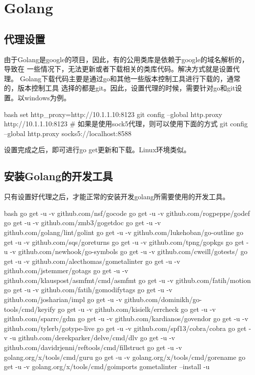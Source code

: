 \chapter{Golang}

\section{代理设置}
由于Golang是google的项目，因此，有的公用类库是依赖于google的域名解析的，导致在
一些情况下，无法更新或者下载相关的类库代码。解决方式就是设置代理。
Golang下载代码主要是通过go和其他一些版本控制工具进行下载的，通常的，版本控制工具
选择的都是git。因此，设置代理的时候，需要针对go和git设置。以windows为例。
\begin{code-block}{bash}
set http_proxy=http://10.1.1.10:8123
git config --global http.proxy http://10.1.1.10:8123
# 如果是使用sock5代理，则可以使用下面的方式
git config --global http.proxy socks5://localhost:8588
\end{code-block}

设置完成之后，即可进行go get更新和下载。Linux环境类似。

\section{安装Golang的开发工具}
只有设置好代理之后，才能正常的安装开发golang所需要使用的开发工具。
\begin{code-block}{bash}
go get -u -v github.com/nsf/gocode
go get -u -v github.com/rogpeppe/godef
go get -u -v github.com/zmb3/gogetdoc
go get -u -v github.com/golang/lint/golint
go get -u -v github.com/lukehoban/go-outline
go get -u -v github.com/sqs/goreturns
go get -u -v github.com/tpng/gopkgs
go get -u -v github.com/newhook/go-symbols
go get -u -v github.com/cweill/gotests/
go get -u -v github.com/alecthomas/gometalinter
go get -u -v github.com/jstemmer/gotags
go get -u -v github.com/klauspost/asmfmt/cmd/asmfmt
go get -u -v github.com/fatih/motion
go get -u -v github.com/fatih/gomodifytags
go get -u -v github.com/josharian/impl
go get -u -v github.com/dominikh/go-tools/cmd/keyify
go get -u -v github.com/kisielk/errcheck
go get -u -v github.com/sparrc/gdm
go get -u -v github.com/kardianos/govendor
go get -u -v github.com/tylerb/gotype-live
go get -u -v github.com/spf13/cobra/cobra
go get -v -u github.com/derekparker/delve/cmd/dlv
go get -u -v github.com/davidrjenni/reftools/cmd/fillstruct
go get -u -v golang.org/x/tools/cmd/guru
go get -u -v golang.org/x/tools/cmd/gorename
go get -u -v golang.org/x/tools/cmd/goimports
gometalinter --install -u
\end{code-block}

